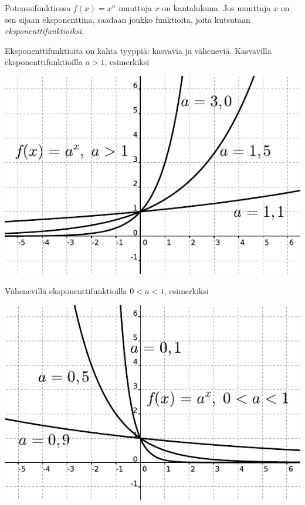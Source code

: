 Potenssifunktiossa $f(x) = x^n$ muuttuja $x$ on kantalukuna. Jos muuttuja
$x$ on sen sijaan eksponenttina, saadaan joukko funktioita, joita
kutsutaan \emph{eksponenttifunktioiksi}.


Eksponenttifunktioita on kahta tyyppiä: kasvavia ja väheneviä.
Kasvavilla eksponenttifunktioilla $a>1$, esimerkiksi

\begin{center}
\includegraphics{pictures/apotenssiinxaisompikuinyksi.pdf}
\end{center}

Vähenevillä eksponenttifunktioilla $0<a<1$, esimerkiksi

\begin{center}
\includegraphics{pictures/apotenssiinxaisompikuinnolla.pdf}
\end{center}

